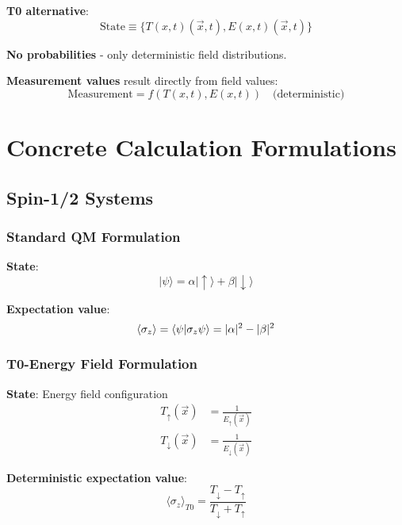 \documentclass[12pt,a4paper]{article}
\newcommand{\Tfield}{T(x,t)}
\newcommand{\Efield}{E(x,t)}
\newcommand{\psiket}[1]{|#1\rangle}
\begin{document}
	\textbf{T0 alternative}:
	\begin{equation}
		\boxed{\text{State} \equiv \{\Tfield(\vec{x},t), \Efield(\vec{x},t)\}}
	\end{equation}
	
	\textbf{No probabilities} - only deterministic field distributions.
	
	\textbf{Measurement values} result directly from field values:
	\begin{equation}
		\text{Measurement} = f(\Tfield, \Efield) \quad \text{(deterministic)}
	\end{equation}
	
	\section{Concrete Calculation Formulations}
	
	\subsection{Spin-1/2 Systems}
	
	\subsubsection{Standard QM Formulation}
	
	\textbf{State}:
	\begin{equation}
		\psiket{\psi} = \alpha\psiket{\uparrow} + \beta\psiket{\downarrow}
	\end{equation}
	
	\textbf{Expectation value}:
	\begin{equation}
		\langle \sigma_z \rangle = \braket{\psi}{\sigma_z \psi} = |\alpha|^2 - |\beta|^2
	\end{equation}
	
	\subsubsection{T0-Energy Field Formulation}
	
	\textbf{State}: Energy field configuration
	\begin{align}
		T_{\uparrow}(\vec{x}) &= \frac{1}{E_{\uparrow}(\vec{x})} \\
		T_{\downarrow}(\vec{x}) &= \frac{1}{E_{\downarrow}(\vec{x})}
	\end{align}
	
	\textbf{Deterministic expectation value}:
	\begin{equation}
		\boxed{\langle \sigma_z \rangle_{T0} = \frac{T_{\downarrow} - T_{\uparrow}}{T_{\downarrow} + T_{\uparrow}}}
	\end{equation}
	
\end{document}
